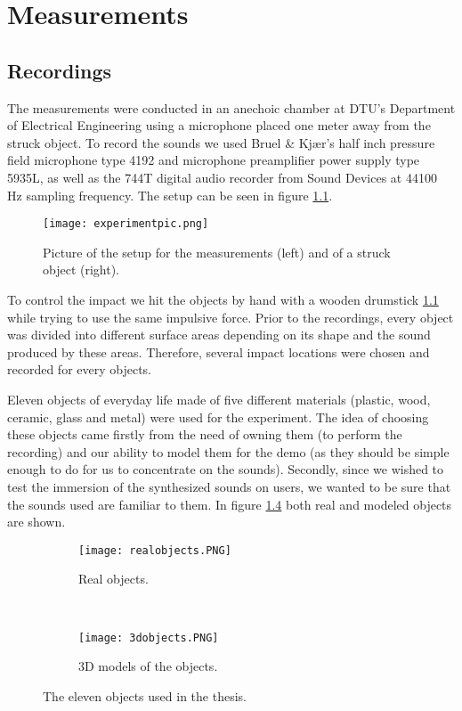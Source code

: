\chapter{Measurements}\label{ch:measurements}

\section{Recordings}

The measurements were conducted in an anechoic chamber at DTU's Department of Electrical Engineering using a microphone placed one meter away from the struck object. To record the sounds we used Bruel \& Kjær's half inch pressure field microphone type 4192 and microphone preamplifier power supply type 5935L, as well as the 744T digital audio recorder from Sound Devices at 44100 Hz sampling frequency. The setup can be seen in figure \ref{fig:experiment}.

\begin{figure}[H]
  \centering
    \texttt{[image: experimentpic.png]}
      \caption{Picture of the setup for the measurements (left) and of a struck object (right).}\label{fig:experiment}
\end{figure}

To control the impact we hit the objects by hand with a wooden drumstick \ref{fig:experiment} while trying to use the same impulsive force. Prior to the recordings, every object was divided into different surface areas depending on its shape and the sound produced by these areas. Therefore, several impact locations were chosen and recorded for every objects.

Eleven objects of everyday life made of five different materials (plastic, wood, ceramic, glass and metal) were used for the experiment. The idea of choosing these objects came firstly from the need of owning them (to perform the recording) and our ability to model them for the demo (as they should be simple enough to do for us to concentrate on the sounds). Secondly, since we wished to test the immersion of the synthesized sounds on users, we wanted to be sure that the sounds used are familiar to them. In figure \ref{fig:objects} both real and modeled objects are shown. 

\begin{figure}[H]
    \centering
    \begin{subfigure}[b]{0.7\textwidth}
        \texttt{[image: realobjects.PNG]}
        \caption{Real objects.}
        \label{fig:gull}
    \end{subfigure}
    ~ %
    \begin{subfigure}[b]{0.7\textwidth}
        \texttt{[image: 3dobjects.PNG]}
        \caption{3D models of the objects.}
        \label{fig:tiger}
    \end{subfigure}
    \caption{The eleven objects used in the thesis.}\label{fig:objects}
\end{figure}

